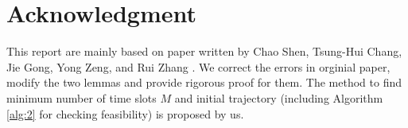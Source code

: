 \documentclass[10pt,final,conference]{IEEEtran}
\begin{document}
\section{Acknowledgment}
This report are mainly based on paper written by Chao Shen, Tsung-Hui Chang, Jie Gong, Yong Zeng, and Rui Zhang \cite{IEEEexample:shen2018multi}. We correct the errors in orginial paper, modify the two lemmas and provide rigorous proof for them. The method to find minimum number of time slots $M$ and initial trajectory (including Algorithm \ref{alg:2} for checking feasibility) is proposed by us.






\end{document}

